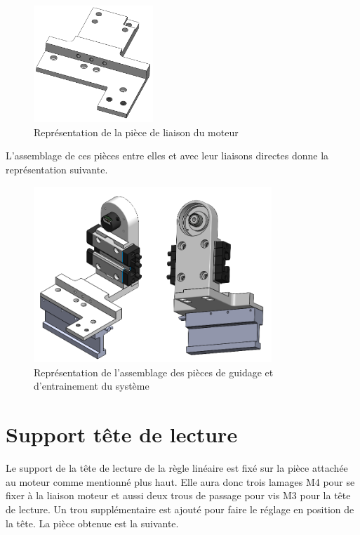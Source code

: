 \begin{figure}[H]
    \centering
    \includegraphics[width = 0.4\textwidth]{assets/figures/LiaisonMoteur.png}
    \caption{Représentation de la pièce de liaison du moteur}
    \label{fig:LiaisonMoteur}
\end{figure}

L'assemblage de ces pièces entre elles et avec leur liaisons directes donne la représentation suivante.

\begin{figure}[H]
    \centering
    \includegraphics[width = 0.8\textwidth]{assets/figures/AssemblageGuidageEntrainement.png}
    \caption{Représentation de l'assemblage des pièces de guidage et d'entrainement du système}
    \label{fig:AssGuiEntr}
\end{figure}

\section{Support tête de lecture}\label{sec:SupTeteLect}
Le support de la tête de lecture de la règle linéaire est fixé sur la pièce attachée au moteur comme mentionné plus haut. Elle aura donc trois
lamages M4 pour se fixer à la liaison moteur et aussi deux trous de passage pour vis M3 pour la tête de lecture. Un trou supplémentaire est ajouté
pour faire le réglage en position de la tête. La pièce obtenue est la suivante.

